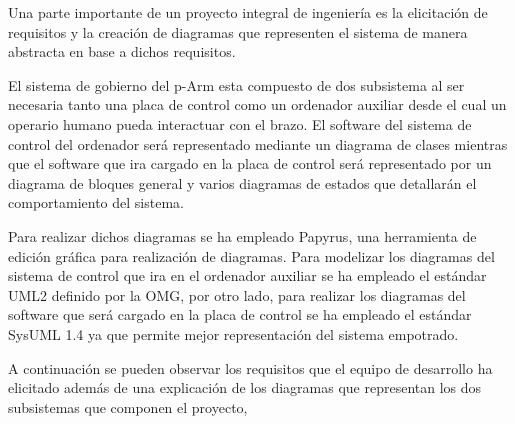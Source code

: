 Una parte importante de un proyecto integral de ingeniería es la elicitación de requisitos y la creación de diagramas que representen el sistema de manera abstracta en base a dichos requisitos.

El sistema de gobierno del p-Arm esta compuesto de dos subsistema al ser necesaria tanto una placa de control como un ordenador auxiliar desde el cual un operario humano pueda interactuar con el brazo. El software del sistema de control del ordenador será representado mediante un diagrama de clases mientras que el software que ira cargado en la placa de control será representado por un diagrama de bloques general y varios diagramas de estados que detallarán el comportamiento del sistema.

Para realizar dichos diagramas se ha empleado Papyrus, una herramienta de edición gráfica para realización de diagramas. Para modelizar los diagramas del sistema de control que ira en el ordenador auxiliar se ha empleado el estándar UML2 definido por la OMG, por otro lado, para realizar los diagramas del software que será cargado en la placa de control se ha empleado el estándar SysUML 1.4 ya que permite mejor representación del sistema empotrado.

A continuación se pueden observar los requisitos que el equipo de desarrollo ha elicitado además de una explicación de los diagramas que representan los dos subsistemas que componen el proyecto,



